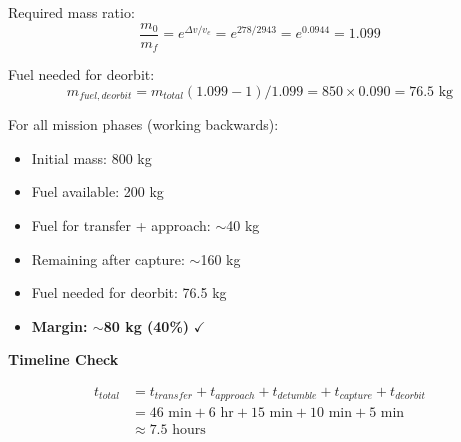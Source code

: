 \documentclass[11pt,a4paper]{article}
\begin{document}
Required mass ratio:
\begin{equation}
\frac{m_0}{m_f} = e^{\Delta v / v_e} = e^{278/2943} = e^{0.0944} = 1.099
\end{equation}

Fuel needed for deorbit:
\begin{equation}
m_{fuel,deorbit} = m_{total}(1.099 - 1) / 1.099 = 850 \times 0.090 = 76.5 \text{ kg}
\end{equation}

For all mission phases (working backwards):
\begin{itemize}[nosep]
    \item Initial mass: 800 kg
    \item Fuel available: 200 kg
    \item Fuel for transfer + approach: $\sim$40 kg
    \item Remaining after capture: $\sim$160 kg
    \item Fuel needed for deorbit: 76.5 kg
    \item \textbf{Margin: $\sim$80 kg (40\%)} $\checkmark$
\end{itemize}

\textbf{Timeline Check}

\begin{align}
t_{total} &= t_{transfer} + t_{approach} + t_{detumble} + t_{capture} + t_{deorbit} \\
&= 46\text{ min} + 6\text{ hr} + 15\text{ min} + 10\text{ min} + 5\text{ min} \\
&\approx 7.5 \text{ hours}
\end{align}
\end{document}
